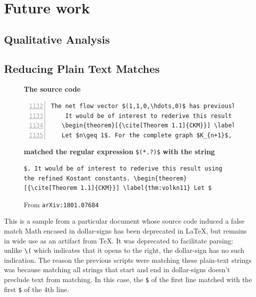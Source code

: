 \documentclass{article}
\begin{document}
\section{Future work}


\printbibliography{}

\newpage
\begin{appendix}
  \section{Qualitative Analysis}
  \subsection{Reducing Plain Text Matches}
\begin{figure}[!h]
  \qquad \textbf{The source code}
  \begin{lstlisting}[escapechar=!, basicstyle=\footnotesize\ttfamily, numbers=left, firstnumber=1132]
    The net flow vector $(1,1,0,\hdots,0)$ has previously been considered for the complete graph by Corteel, Kim, and M\'esz\'aros \cite{CKM}.  They used the Lidskii formula~\eqref{eq:lidskiivol} and constant term identities to derive the following product formula for the volume of $\mathcal{F}_{K_{n+1}}(1,1,0,\ldot     s,0)$.
    It would be of interest to rederive this result using the refined Kostant constants.
   \begin{theorem}[{\cite[Theorem 1.1]{CKM}}] \label{thm:volkn11}
   Let $n\geq 1$. For the complete graph $K_{n+1}$,

  \end{lstlisting}
  \qquad \textbf{matched the regular expression} \verb|$(*.?)$| \textbf{with the string} 
  \begin{lstlisting}[basicstyle=\footnotesize\ttfamily]
  $. It would be of interest to rederive this result using the refined Kostant constants. \begin{theorem}[{\cite[Theorem 1.1]{CKM}}] \label{thm:volkn11} Let $    
  \end{lstlisting}
   \cprotect\caption{From \texttt{arXiv:1801.07684} \citeauthor{benedetti2018combinatorial} }\label{falsematch}


\end{figure}
This is a sample from a particular document whose source code induced a false
match Math encased in dollar-signs has been deprecated in \LaTeX{}, but remains
in wide use as an artifact from \TeX{}. It was deprecated to facilitate parsing:
unlike \verb|\(| which indicates that it opens to the right, the dollar-sign has
no such indication. The reason the previous scripts were matching these
plain-text strings was because matching all strings that start and end in
dollar-signs doesn't preclude text from matching. In this case, the \verb|$| of
the first line matched with the first \verb|$| of the 4th line. 

\end{appendix}
\end{document}
